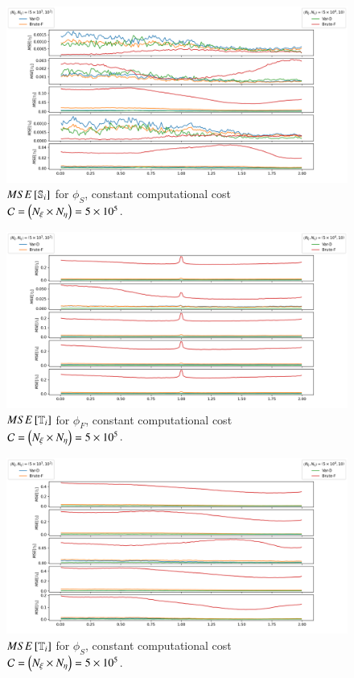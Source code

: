 \begin{figure}
    \centering
    \includegraphics[width=\textwidth]{figures/mse_firstorder_slow.png}
    \caption{$MSE\left[\S{i}\right]$ for $\phi_S$, constant computational cost $\C = \left( \Nxi \times \Neta \right) = 5 \times 10^5$.}
    \label{fig:mse-fo-slow}
\end{figure}

\begin{figure}
    \centering
    \includegraphics[width=\textwidth]{figures/mse_totalorder_fast.png}
    \caption{$MSE\left[\T{i}\right]$ for $\phi_F$, constant computational cost $\C = \left( \Nxi \times \Neta \right) = 5 \times 10^5$.}
    \label{fig:mse-to-fast}
\end{figure}

\begin{figure}
    \centering
    \includegraphics[width=\textwidth]{figures/mse_totalorder_slow.png}
    \caption{$MSE\left[\T{i}\right]$ for $\phi_S$, constant computational cost $\C = \left( \Nxi \times \Neta \right) = 5 \times 10^5$.}
    \label{fig:mse-to-slow}
\end{figure}

